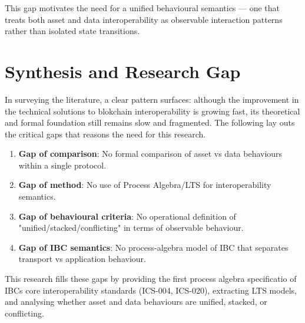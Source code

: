 This gap motivates the need for a unified behavioural semantics --- one
that treats both asset and data interoperability as observable
interaction patterns rather than isolated state transitions.

\section{Synthesis and Research Gap}\label{synthesis-and-research-gap}

In surveying the literature, a clear pattern surfaces: although the
improvement in the technical solutions to blokchain interoperability is
growing fast, its theoretical and formal foundation still remains slow
and fragmented. The following lay outs the critical gaps that reasons
the need for this research.

\begin{enumerate}
\tightlist
\item
  \textbf{Gap of comparison}: No formal comparison of asset vs data
  behaviours within a single protocol.
\item
  \textbf{Gap of method}: No use of Process Algebra/LTS for
  interoperability semantics.
\item
  \textbf{Gap of behavioural criteria}: No operational definition of
  "unified/stacked/conflicting" in terms of observable behaviour.
\item
  \textbf{Gap of IBC semantics}: No process-algebra model of IBC that
  separates transport vs application behaviour.
\end{enumerate}

This research fills these gaps by providing the first process algebra
specificatio of IBC\textquotesingle s core interoperability standards
(ICS-004, ICS-020), extracting LTS models, and analysing whether asset
and data behaviours are unified, stacked, or conflicting.

